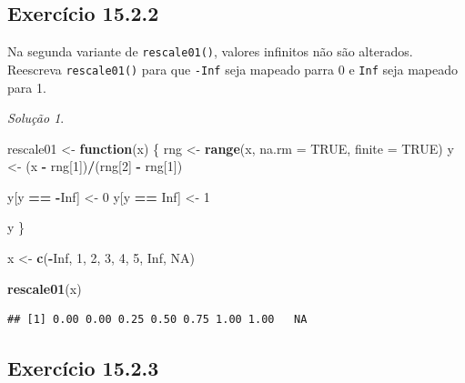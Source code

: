 \documentclass[
]{latex/krantz}
\newenvironment{Shaded}{\begin{snugshade}}{\end{snugshade}}
\newcommand{\AttributeTok}[1]{\textcolor[rgb]{0.13,0.29,0.53}{#1}}
\newcommand{\ConstantTok}[1]{\textcolor[rgb]{0.56,0.35,0.01}{#1}}
\newcommand{\ControlFlowTok}[1]{\textcolor[rgb]{0.13,0.29,0.53}{\textbf{#1}}}
\newcommand{\DecValTok}[1]{\textcolor[rgb]{0.00,0.00,0.81}{#1}}
\newcommand{\FunctionTok}[1]{\textcolor[rgb]{0.13,0.29,0.53}{\textbf{#1}}}
\newcommand{\NormalTok}[1]{#1}
\newcommand{\OtherTok}[1]{\textcolor[rgb]{0.56,0.35,0.01}{#1}}
\newcommand{\SpecialCharTok}[1]{\textcolor[rgb]{0.81,0.36,0.00}{\textbf{#1}}}
\theoremstyle{definition}
\theoremstyle{definition}
\theoremstyle{definition}
\theoremstyle{definition}
\theoremstyle{remark}
\newtheorem*{solution}{Solução}
\begin{document}
\hypertarget{exr15-2-2}{%
\subsection*{Exercício 15.2.2}\label{exr15-2-2}}

Na segunda variante de \texttt{rescale01()}, valores infinitos não são alterados. Reescreva \texttt{rescale01()} para que \texttt{-Inf} seja mapeado parra 0 e \texttt{Inf} seja mapeado para 1.

\begin{solution}
\leavevmode

\begin{Shaded}
\begin{Highlighting}[]
\NormalTok{rescale01 }\OtherTok{\textless{}{-}} \ControlFlowTok{function}\NormalTok{(x) \{}
\NormalTok{  rng }\OtherTok{\textless{}{-}} \FunctionTok{range}\NormalTok{(x, }\AttributeTok{na.rm =} \ConstantTok{TRUE}\NormalTok{, }\AttributeTok{finite =} \ConstantTok{TRUE}\NormalTok{)}
\NormalTok{  y }\OtherTok{\textless{}{-}}\NormalTok{ (x }\SpecialCharTok{{-}}\NormalTok{ rng[}\DecValTok{1}\NormalTok{])}\SpecialCharTok{/}\NormalTok{(rng[}\DecValTok{2}\NormalTok{] }\SpecialCharTok{{-}}\NormalTok{ rng[}\DecValTok{1}\NormalTok{])}
  
\NormalTok{  y[y }\SpecialCharTok{==} \SpecialCharTok{{-}}\ConstantTok{Inf}\NormalTok{] }\OtherTok{\textless{}{-}} \DecValTok{0}
\NormalTok{  y[y }\SpecialCharTok{==} \ConstantTok{Inf}\NormalTok{] }\OtherTok{\textless{}{-}} \DecValTok{1}
  
\NormalTok{  y}
\NormalTok{\}}

\NormalTok{x }\OtherTok{\textless{}{-}} \FunctionTok{c}\NormalTok{(}\SpecialCharTok{{-}}\ConstantTok{Inf}\NormalTok{, }\DecValTok{1}\NormalTok{, }\DecValTok{2}\NormalTok{, }\DecValTok{3}\NormalTok{, }\DecValTok{4}\NormalTok{, }\DecValTok{5}\NormalTok{, }\ConstantTok{Inf}\NormalTok{, }\ConstantTok{NA}\NormalTok{)}

\FunctionTok{rescale01}\NormalTok{(x)}
\end{Highlighting}
\end{Shaded}

\begin{verbatim}
## [1] 0.00 0.00 0.25 0.50 0.75 1.00 1.00   NA
\end{verbatim}

\end{solution}

\hypertarget{exr15-2-3}{%
\subsection*{Exercício 15.2.3}\label{exr15-2-3}}
\end{document}
